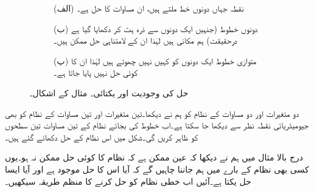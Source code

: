\begin{figure}
\centering
\begin{subfigure}{0.5\textwidth}
\centering
{}
\caption*{(الف) نقطہ  جہاں دونوں خط ملتے ہیں، ان مساوات کا حل ہے۔}
\end{subfigure}%
\begin{subfigure}{0.5\textwidth}
\centering
{}
\caption*{(ب) دونوں خطوط (جنہیں ایک دونوں سے ذرہ ہٹ کر دکھایا گیا ہے درحقیقت) ہم مکانی ہیں لہٰذا ان کے لامتناہی حل ممکن ہیں۔}
\end{subfigure}
\begin{subfigure}{0.5\textwidth}
\centering
{}
\caption*{(پ) متوازی خطوط ایک دونوں کو کہیں نہیں چھوتے ہیں لہٰذا ان کا کوئی حل نہیں پایا جاتا ہے۔}
\end{subfigure}%
\caption{حل کی وجودیت اور یکتائی۔ مثال  کے اشکال۔}
\label{شکل_مثال_الجبرا_وجودیت_یکتائی_حل_الف}
\end{figure}
دو متغیرات اور دو مساوات کے نظام کو ہم نے دیکھا۔تین متغیرات اور تین مساوات کے نظام  کو بھی جیومیٹریائی نقطہ نظر سے دیکھا جا سکتا ہے۔اب خطوط کی بجائے نظام کے تین مساوات تین سطحوں کو ظاہر کریں گی۔شکل میں اس نظام کے حل دکھائے گئے ہیں۔

درج بالا مثال میں ہم نے دیکھا کہ عین ممکن ہے کہ نظام کا کوئی حل ممکن نہ ہو۔یوں کسی بھی نظام کے بارے میں ہم جاننا چاہیں گے کہ آیا اس کا حل موجود ہے اور آیا ایسا حل یکتا ہے۔آئیں اب خطی نظام کو حل کرنے کا منظم طریقہ سیکھیں۔

